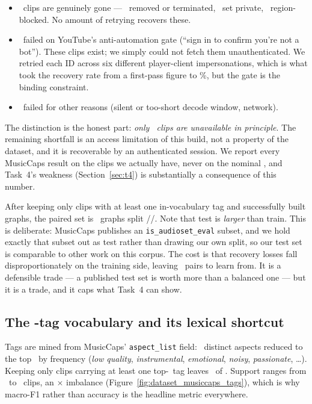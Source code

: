 \documentclass[10pt,a4paper]{article}
\begin{document}
\begin{itemize}\itemsep1pt
\item \mcPermanentlyGone\ clips are genuinely gone --- \mcUnavailable\ removed or
      terminated, \mcPrivate\ set private, \mcGeoBlocked\ region-blocked. No
      amount of retrying recovers these.
\item \mcBotCheck\ failed on YouTube's anti-automation gate (``sign in to confirm
      you're not a bot''). These clips exist; we simply could not fetch them
      unauthenticated. We retried each ID across six different player-client
      impersonations, which is what took the recovery rate from a first-pass
      figure to \mcRecoveryPct\%, but the gate is the binding constraint.
\item \mcOtherFail\ failed for other reasons (silent or too-short decode window,
      network).
\end{itemize}

The distinction is the honest part: \emph{only \mcPermanentlyGone\ clips are
unavailable in principle}. The remaining shortfall is an access limitation of
this build, not a property of the dataset, and it is recoverable by an
authenticated session. We report every MusicCaps result on the clips we actually
have, never on the nominal \mcNominal, and Task~4's weakness
(Section~\ref{sec:t4}) is substantially a consequence of this number.

After keeping only clips with at least one in-vocabulary tag and successfully
built graphs, the paired set is \mcGraphs\ graphs split
\mcNTrain/\mcNVal/\mcNTest. Note that test is \emph{larger} than train. This is
deliberate: MusicCaps publishes an \texttt{is\_audioset\_eval} subset, and we
hold exactly that subset out as test rather than drawing our own split, so our
test set is comparable to other work on this corpus. The cost is that recovery
losses fall disproportionately on the training side, leaving
\tFourNTrain\ pairs to learn from. It is a defensible trade --- a published test
set is worth more than a balanced one --- but it is a trade, and it caps what
Task~4 can show.

\subsection{The \cfgNumTags-tag vocabulary and its lexical shortcut}
\label{sec:shortcut}
Tags are mined from MusicCaps' \texttt{aspect\_list} field: \mcAspectsDistinct\ distinct
aspects reduced to the top \cfgNumTags\ by frequency (\emph{low quality},
\emph{instrumental}, \emph{emotional}, \emph{noisy}, \emph{passionate}, \dots).
Keeping only clips carrying at least one top-\cfgNumTags\ tag leaves
\mcRowsKept\ of \mcNominal. Support ranges from \mcTagSupportMin\ to
\mcTagSupportMax\ clips, an \mcTagImbalance$\times$ imbalance
(Figure~\ref{fig:dataset_musiccaps_tags}), which is why macro-F1 rather than
accuracy is the headline metric everywhere.
\end{document}
